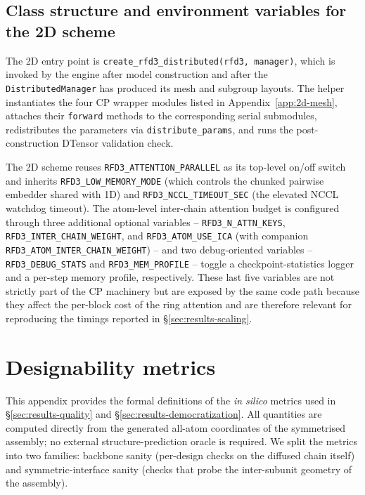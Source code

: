 \documentclass{article}
\theoremstyle{plain}
\theoremstyle{definition}
\theoremstyle{remark}
\begin{document}
\subsection{Class structure and environment variables for the 2D scheme}
\label{app:2d-classes}

The 2D entry point is \texttt{create\_rfd3\_distributed(rfd3, manager)}, which is invoked by the engine after model construction and after the \texttt{DistributedManager} has produced its mesh and subgroup layouts. The helper instantiates the four CP wrapper modules listed in Appendix~\ref{app:2d-mesh}, attaches their \texttt{forward} methods to the corresponding serial submodules, redistributes the parameters via \texttt{distribute\_params}, and runs the post-construction DTensor validation check.

The 2D scheme reuses \texttt{RFD3\_ATTENTION\_PARALLEL} as its top-level on/off switch and inherits \texttt{RFD3\_LOW\_MEMORY\_MODE} (which controls the chunked pairwise embedder shared with 1D) and \texttt{RFD3\_NCCL\_TIMEOUT\_SEC} (the elevated NCCL watchdog timeout). The atom-level inter-chain attention budget is configured through three additional optional variables -- \texttt{RFD3\_N\_ATTN\_KEYS}, \texttt{RFD3\_INTER\_CHAIN\_WEIGHT}, and \texttt{RFD3\_ATOM\_USE\_ICA} (with companion \texttt{RFD3\_ATOM\_INTER\_CHAIN\_WEIGHT}) -- and two debug-oriented variables -- \texttt{RFD3\_DEBUG\_STATS} and \texttt{RFD3\_MEM\_PROFILE} -- toggle a checkpoint-statistics logger and a per-step memory profile, respectively. These last five variables are not strictly part of the CP machinery but are exposed by the same code path because they affect the per-block cost of the ring attention and are therefore relevant for reproducing the timings reported in \S\ref{sec:results-scaling}.


\section{Designability metrics}
\label{app:designability}

This appendix provides the formal definitions of the \emph{in silico} metrics used in \S\ref{sec:results-quality} and \S\ref{sec:results-democratization}. All quantities are computed directly from the generated all-atom coordinates of the symmetrised assembly; no external structure-prediction oracle is required. We split the metrics into two families: backbone sanity (per-design checks on the diffused chain itself) and symmetric-interface sanity (checks that probe the inter-subunit geometry of the assembly).
\end{document}
